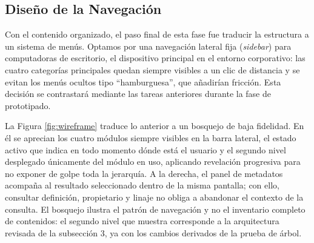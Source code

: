 \subsection{Diseño de la Navegación}
Con el contenido organizado, el paso final de esta fase fue traducir la estructura a un sistema de menús. Optamos por una navegación lateral fija (\textit{sidebar}) para computadoras de escritorio, el dispositivo principal en el entorno corporativo: las cuatro categorías principales quedan siempre visibles a un clic de distancia y se evitan los menús ocultos tipo ``hamburguesa'', que añadirían fricción. Esta decisión se contrastará mediante las tareas anteriores durante la fase de prototipado.

La Figura \ref{fig:wireframe} traduce lo anterior a un bosquejo de baja fidelidad. En él se aprecian los cuatro módulos siempre visibles en la barra lateral, el estado activo que indica en todo momento dónde está el usuario y el segundo nivel desplegado únicamente del módulo en uso, aplicando revelación progresiva para no exponer de golpe toda la jerarquía. A la derecha, el panel de metadatos acompaña al resultado seleccionado dentro de la misma pantalla; con ello, consultar definición, propietario y linaje no obliga a abandonar el contexto de la consulta. El bosquejo ilustra el patrón de navegación y no el inventario completo de contenidos: el segundo nivel que muestra corresponde a la arquitectura revisada de la subsección 3, ya con los cambios derivados de la prueba de árbol.

